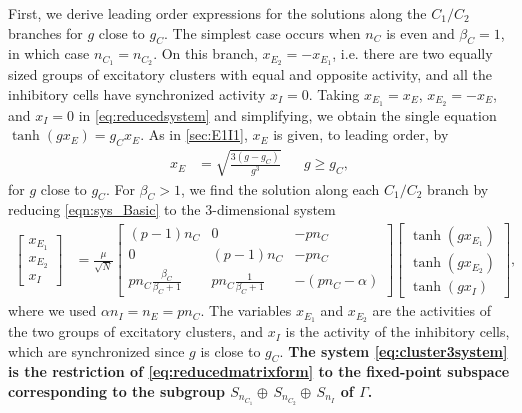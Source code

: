 \documentclass[reqno]{siamonline190516}
\newcommand{\revised}[1]{ \textbf{#1} }
\begin{document}
First, we derive leading order expressions for the solutions along the $C_1/C_2$ branches for $g$ close to $g_C$. The simplest case occurs when $n_C$ is even and $\beta_C = 1$, in which case $n_{C_1}=n_{C_2}$. On this branch, $x_{E_2} = -x_{E_1}$, i.e. there are two equally sized groups of excitatory clusters with equal and opposite activity, and all the inhibitory cells have synchronized activity $x_I = 0$. Taking $x_{E_1} = x_E$, $x_{E_2} = -x_E$, and $x_I = 0$ in \cref{eq:reducedsystem} and simplifying, we obtain the single equation $\tanh(g x_E) = g_C x_E$. As in \cref{sec:E1I1}, $x_E$ is given, to leading order, by
\begin{align}\label{eq:xEapprox}
x_E &= \sqrt{ \frac{3(g - g_C) }{g^3}} && g \geq g_C,
\end{align}
for $g$ close to $g_C$. For $\beta_C > 1$, we find the solution along each $C_1/C_2$ branch by reducing \cref{eqn:sys_Basic} to the 3-dimensional system
\begin{equation}\label{eq:cluster3system}
 \begin{aligned}
 \begin{bmatrix} x_{E_1} \\ x_{E_2} \\ x_{I} \end{bmatrix} 
 &= \frac{\mu}{\sqrt{N}} 
 \begin{bmatrix} 
    (p-1)n_C & 0 & -p n_C  \\
    0  & (p-1)n_C & -p n_C \\
    p n_C \frac{\beta_C}{\beta_C+1} &
    p n_C \frac{1}{\beta_C+1} &
    -(p n_C - \alpha)
 \end{bmatrix}
 \begin{bmatrix} \tanh(g x_{E_1}) \\\tanh ( g x_{E_2} ) \\\tanh(g x_{I})\end{bmatrix},
 \end{aligned}
 \end{equation}
 where we used $\alpha n_I = n_E = p n_C$. The variables $x_{E_1}$ and $x_{E_2}$ are the activities of the two groups of excitatory clusters, and $x_I$ is the activity of the inhibitory cells, which are synchronized since $g$ is close to $g_C$. 
\revised{
The system \cref{eq:cluster3system} is the restriction of \cref{eq:reducedmatrixform} to the fixed-point subspace corresponding to the subgroup $S_{n_{C_1}} \oplus \, S_{n_{C_2}} \oplus \, S_{n_I}$ of $\Gamma$.
}
\end{document}
